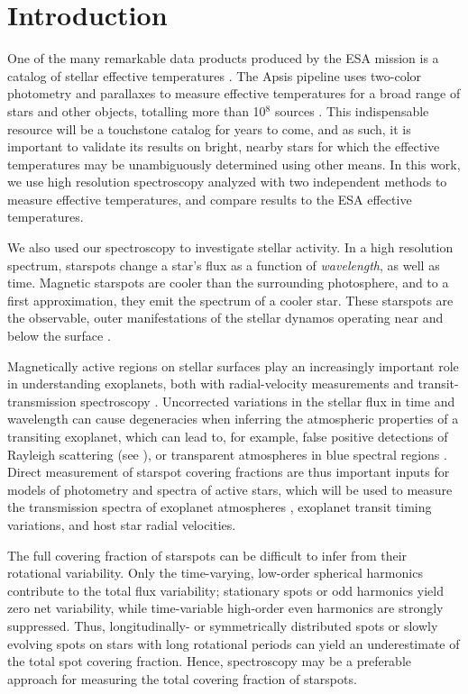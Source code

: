 \section{Introduction}

One of the many remarkable data products produced by the ESA \gaia mission is a catalog of stellar effective temperatures \citep{GaiaDR2}. The \gaia Apsis pipeline uses two-color photometry and parallaxes to measure effective temperatures for a broad range of stars and other objects, totalling more than 10$^8$ sources \citep{Bailer-Jones2013, DR2prop}. This indispensable resource will be a touchstone catalog for years to come, and as such, it is important to validate its results on bright, nearby stars for which the effective temperatures may be unambiguously determined using other means. In this work, we use high resolution spectroscopy analyzed with two independent methods to measure effective temperatures, and compare results to the ESA \gaia effective temperatures.

We also used our spectroscopy to investigate stellar activity. In a high resolution spectrum, starspots change a star's flux as a function of \textit{wavelength}, as well as time. Magnetic starspots are cooler than the surrounding photosphere, and to a first approximation, they emit the spectrum of a cooler star. These starspots are the observable, outer manifestations of the stellar dynamos operating near and below the surface \citep{Berdyugina2005}. 

Magnetically active regions on stellar surfaces play an increasingly important role in understanding exoplanets, both with radial-velocity measurements and transit-transmission spectroscopy \citep[][and references therein]{Cameron2017, Zellem2017}.  Uncorrected variations in the stellar flux in time and wavelength can cause degeneracies when inferring the atmospheric properties of a transiting exoplanet, which can lead to, for example, false positive detections of Rayleigh scattering (see \citealt{Sing2011, McCullough2014, Oshagh2014}), or  transparent atmospheres in blue spectral regions \citep{Rackham2018, Morris2018c}.
Direct measurement of starspot covering fractions are thus important inputs for models of photometry and spectra of active stars, which will be used to measure the transmission spectra of exoplanet atmospheres \citep{Wakeford2018}, exoplanet transit timing variations, and host star radial velocities.  

The full covering fraction of starspots can be difficult to infer from their rotational variability. Only the time-varying, low-order spherical harmonics contribute to the total flux variability; stationary spots or odd harmonics yield zero net variability, while time-variable high-order even harmonics are strongly suppressed.  Thus, longitudinally- or symmetrically distributed spots or slowly evolving spots on stars with long rotational periods can yield an underestimate of the total spot covering fraction. Hence, spectroscopy may be a preferable approach for measuring the total covering fraction of starspots.


